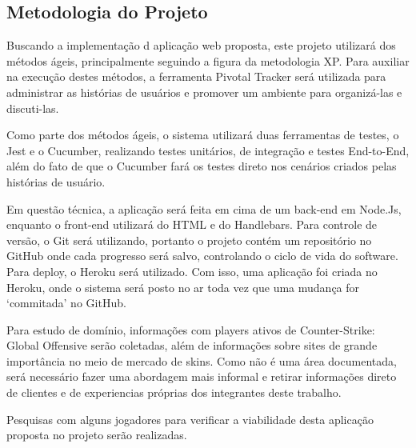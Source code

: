 \subsection{Metodologia do Projeto}
    Buscando a implementação d aplicação web proposta, este projeto utilizará dos métodos ágeis, principalmente seguindo a figura da metodologia XP. Para auxiliar na execução destes métodos, a ferramenta Pivotal Tracker será utilizada para administrar as histórias de usuários e promover um ambiente para organizá-las e discuti-las.
    
    Como parte dos métodos ágeis, o sistema utilizará duas ferramentas de testes, o Jest e o Cucumber, realizando testes unitários, de integração e testes End-to-End, além do fato de que o Cucumber fará os testes direto nos cenários criados pelas histórias de usuário.
    
    Em questão técnica, a aplicação será feita em cima de um back-end em Node.Js, enquanto o front-end utilizará do HTML e do Handlebars. Para controle de versão, o Git será utilizando, portanto o projeto contém um repositório no GitHub onde cada progresso será salvo, controlando o ciclo de vida do software. Para deploy, o Heroku será utilizado. Com isso, uma aplicação foi criada no Heroku, onde o sistema será posto no ar toda vez que uma mudança for ‘commitada’ no GitHub.
    
    Para estudo de domínio, informações com players ativos de Counter-Strike: Global Offensive serão coletadas, além de informações sobre sites de grande importância no meio de mercado de skins. Como não é uma área documentada, será necessário fazer uma abordagem mais informal e retirar informações direto de clientes e de experiencias próprias dos integrantes deste trabalho.
    
    Pesquisas com alguns jogadores para verificar a viabilidade desta aplicação proposta no projeto serão realizadas.






